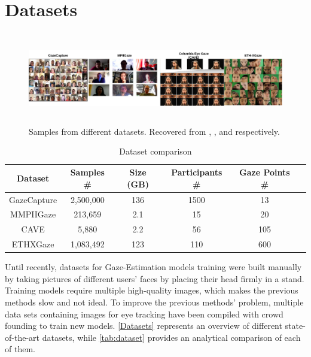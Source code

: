 \section{Datasets}
\label{state-art-datasets}


\begin{figure}
    \centering
    \includegraphics[width=\textwidth,height=4cm]{img/figures/datasets.png}
    \caption{Samples from different datasets. Recovered from \cite{GazeCapture}, \cite{GazeEstimationInTheWild}, \cite{CAVE_0324} and \cite{Zhang2020ETHXGaze} respectively. }
    \label{Datasets}
 \end{figure}

 \begin{table}[h!]
    \caption{Dataset comparison}
    \centering
    \label{tab:dataset}
    \begin{tabular}{c c c c c c}
    \hline\hline
    Dataset & Samples \# & Size (GB) & Participants \# & Gaze Points \# \\
    \hline\hline
        GazeCapture & 2,500,000 & 136 & 1500 & 13 \\
        MMPIIGaze & 213,659 & 2.1 & 15 & 20 \\
        CAVE & 5,880 & 2.2 & 56 & 105 \\
        ETHXGaze & 1,083,492 & 123 & 110 & 600 \\ [1ex]
    \hline
    \end{tabular}
\end{table}

Until recently, datasets for Gaze-Estimation models training were built manually by taking pictures of different users' faces by placing their head firmly in a stand. Training models require multiple high-quality images, which makes the previous methods slow and not ideal.
To improve the previous methods' problem, multiple data sets containing images for eye tracking have been compiled with crowd founding to train new models.
\autoref{Datasets} represents an overview of different state-of-the-art datasets, while \autoref{tab:dataset} provides an analytical comparison of each of them.

